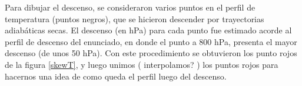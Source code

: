 \documentclass[../main.tex]{subfiles}
\begin{document}
\begin{enumerate}[a)]
Para dibujar el descenso, se consideraron varios puntos en el perfil de temperatura (puntos negros), que se hicieron descender por trayectorias adiabáticas secas. El descenso (en hPa) para cada punto fue estimado acorde al perfil de descenso del enunciado, en donde el punto a 800 hPa, presenta el mayor descenso (de unos 50 hPa). Con este procedimiento se obtuvieron los punto rojos de la figura \eqref{skewT}, y luego unimos ( interpolamos? ) los puntos rojos para hacernos una idea de como queda el perfil luego del descenso.
\end{enumerate}
\end{document}

